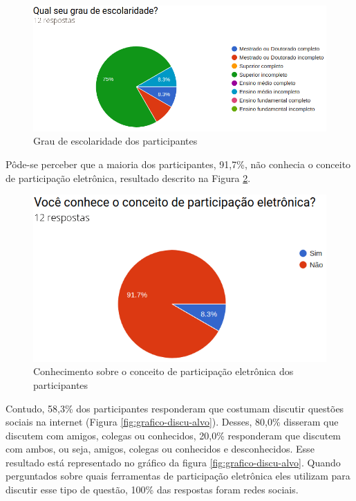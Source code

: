 \begin{figure}[!ht]
    \centering
    \includegraphics[scale=0.4]{./figuras/grau_escolaridade.png}
    \caption{Grau de escolaridade dos participantes}
    \label{fig:grafico-grau}
\end{figure}

\par
Pôde-se perceber que a maioria dos participantes, 91,7\%, não conhecia o conceito de participação eletrônica, resultado descrito na Figura \ref{fig:grafico-participacao}.

\begin{figure}[!ht]
    \centering
    \includegraphics[scale=0.4]{./figuras/conhece_participacao_eletronica.png}
    \caption{Conhecimento sobre o conceito de participação eletrônica dos participantes}
    \label{fig:grafico-participacao}
\end{figure}

\par
Contudo, 58,3\% dos participantes responderam que costumam discutir questões sociais na internet (Figura \ref{fig:grafico-discu-alvo}). 
Desses, 80,0\% disseram que  discutem com amigos, colegas ou conhecidos, 20,0\%  responderam que discutem com ambos, ou seja, amigos, colegas ou conhecidos e desconhecidos. Esse resultado está representado no gráfico da figura \ref{fig:grafico-discu-alvo}. Quando perguntados sobre quais ferramentas de participação 
eletrônica eles utilizam para discutir esse tipo de questão, 100\% das respostas foram redes sociais. 

